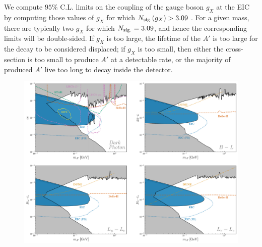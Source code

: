 We compute $95\%$ C.L. limits on the coupling of the gauge boson $g_X$ at the EIC by computing those values of $g_X$ for which $N_{\rm sig.}(g_X) > 3.09$ \cite{Feldman:1997qc}. For a given mass, there are typically two $g_X$ for which $N_{\rm sig.} = 3.09$, and hence the corresponding limits will be double-sided. If $g_X$ is too large, the lifetime of the $A'$ is too large for the decay to be considered displaced; if $g_{X}$ is too small, then either the cross-section is too small to produce $A'$ at a detectable rate, or the majority of produced $A'$ live too long to decay inside the detector. 


\begin{figure}[t!]
    \centering
\includegraphics[width=\linewidth]{figures/chapter6/dark_bosons_EIC.pdf}

\end{figure}
